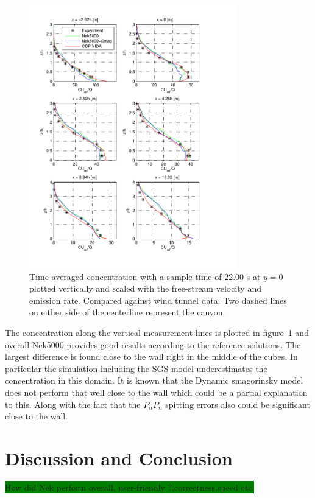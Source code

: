 \newpage
\begin{figure}[h]
    \centering
    \includegraphics[width=0.8\textwidth]{Figures/NekcV_all.pdf}
    \caption{Time-averaged concentration with a sample time of $22.00$ s at $y = 0$ plotted
    vertically and scaled 
    with the free-stream velocity and emission rate. Compared against wind tunnel data.
Two dashed lines on either side of the centerline represent the canyon.}
    \label{fig:cVall}
\end{figure}
The concentration along the vertical measurement lines is plotted in figure~\ref{fig:cVall} and overall 
Nek5000 provides good results according to the reference solutions. The largest difference is found close 
to the wall right in the middle of the cubes. In particular the simulation including the SGS-model 
underestimates the concentration in this domain. It is known that the Dynamic smagorinsky model does not 
perform that well close to the wall which could be a partial explanation to this. Along with the fact that 
the $P_nP_n$ spitting errors also could be significant close to the wall.




\section{Discussion and Conclusion}
\colorbox{green}{How did Nek perform overall, user-friendly ?,correctness,speed etc.}

